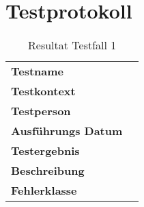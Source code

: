\section{Testprotokoll}


\begin{table}[H]
    \begin{tabular}{|L{0.3\textwidth}|L{0.65\textwidth}|}
        \hline
           \\[10pt]
        \hline
        \textbf{Testname} &  \\
        \hline
        \textbf{Testkontext} &  \\
        \hline
        \textbf{Testperson} &  \\
        \hline
        \textbf{Ausführungs Datum} &  \\
        \hline
        \textbf{Testergebnis} &  \\
        \hline
        \textbf{Beschreibung} &  \\ 
        \hline
        \textbf{Fehlerklasse} & \\ 
        \hline
    \end{tabular}
    \caption{Resultat Testfall 1}
\end{table}

